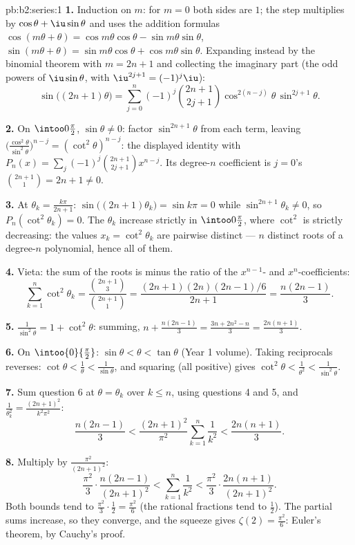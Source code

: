 \begin{solution}{pb:b2:series:1}
\textbf{1.} Induction on $m$: for $m = 0$ both sides are $1$;
the step multiplies by $\cos\theta + \iu\sin\theta$ and uses the
addition formulas $\cos(m\theta + \theta) =
\cos m\theta\cos\theta - \sin m\theta\sin\theta$, $\sin(m\theta
+ \theta) = \sin m\theta\cos\theta + \cos m\theta\sin\theta$.
Expanding instead by the binomial theorem with $m = 2n+1$ and
collecting the imaginary part (the odd powers of
$\iu\sin\theta$, with $\iu^{2j+1} = (-1)^j\iu$):
\[
\sin\bigl((2n{+}1)\theta\bigr) = \sum_{j=0}^{n}(-1)^j
\binom{2n+1}{2j+1}\cos^{2(n-j)}\theta\,\sin^{2j+1}\theta .
\]

\textbf{2.} On $\intoo0{\frac\pi2}$, $\sin\theta \neq 0$: factor
$\sin^{2n+1}\theta$ from each term, leaving
$\bigl(\frac{\cos^2\theta}{\sin^2\theta}\bigr)^{n-j} =
(\cot^2\theta)^{n-j}$: the displayed identity with $P_n(x) =
\sum_j(-1)^j\binom{2n+1}{2j+1}x^{n-j}$. Its degree-$n$
coefficient is $j = 0$'s $\binom{2n+1}{1} = 2n + 1 \neq 0$.

\textbf{3.} At $\theta_k = \frac{k\pi}{2n+1}$:
$\sin\bigl((2n{+}1)\theta_k\bigr) = \sin k\pi = 0$ while
$\sin^{2n+1}\theta_k \neq 0$, so $P_n(\cot^2\theta_k) = 0$. The
$\theta_k$ increase strictly in $\intoo0{\frac\pi2}$, where
$\cot^2$ is strictly decreasing: the values $x_k =
\cot^2\theta_k$ are pairwise distinct --- $n$ distinct roots of
a degree-$n$ polynomial, hence all of them.

\textbf{4.} Vieta: the sum of the roots is minus the ratio of
the $x^{n-1}$- and $x^n$-coefficients:
\[
\sum_{k=1}^{n}\cot^2\theta_k =
\frac{\binom{2n+1}{3}}{\binom{2n+1}{1}}
= \frac{(2n+1)(2n)(2n-1)/6}{2n+1} = \frac{n(2n-1)}{3}.
\]

\textbf{5.} $\frac{1}{\sin^2\theta} = 1 + \cot^2\theta$:
summing, $n + \frac{n(2n-1)}3 = \frac{3n + 2n^2 - n}{3} =
\frac{2n(n+1)}{3}$.

\textbf{6.} On $\intoo{0}{\frac\pi2}$: $\sin\theta < \theta <
\tan\theta$ (Year 1 volume). Taking reciprocals reverses:
$\cot\theta < \frac1\theta < \frac1{\sin\theta}$, and squaring
(all positive) gives $\cot^2\theta < \frac1{\theta^2} <
\frac1{\sin^2\theta}$.

\textbf{7.} Sum question 6 at $\theta = \theta_k$ over $k \leq
n$, using questions 4 and 5, and $\frac1{\theta_k^2} =
\frac{(2n+1)^2}{k^2\pi^2}$:
\[
\frac{n(2n-1)}3 < \frac{(2n+1)^2}{\pi^2}\sum_{k=1}^n\frac1{k^2}
< \frac{2n(n+1)}3 .
\]

\textbf{8.} Multiply by $\frac{\pi^2}{(2n+1)^2}$:
\[
\frac{\pi^2}{3}\cdot\frac{n(2n-1)}{(2n+1)^2}
< \sum_{k=1}^{n}\frac1{k^2} <
\frac{\pi^2}{3}\cdot\frac{2n(n+1)}{(2n+1)^2}.
\]
Both bounds tend to $\frac{\pi^2}3\cdot\frac12 = \frac{\pi^2}6$
(the rational fractions tend to $\frac12$). The partial sums
increase, so they converge, and the squeeze gives $\zeta(2) =
\frac{\pi^2}6$: Euler's theorem, by Cauchy's proof.


\end{solution}
